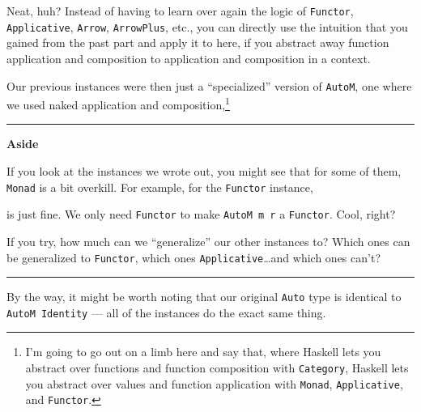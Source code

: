 \documentclass[]{article}
\newenvironment{Shaded}{}{}
\newcommand{\DataTypeTok}[1]{\textcolor[rgb]{0.56,0.13,0.00}{#1}}
\newcommand{\FunctionTok}[1]{\textcolor[rgb]{0.02,0.16,0.49}{#1}}
\newcommand{\KeywordTok}[1]{\textcolor[rgb]{0.00,0.44,0.13}{\textbf{#1}}}
\newcommand{\NormalTok}[1]{#1}
\newcommand{\OtherTok}[1]{\textcolor[rgb]{0.00,0.44,0.13}{#1}}
\begin{document}
Neat, huh? Instead of having to learn over again the logic of \texttt{Functor},
\texttt{Applicative}, \texttt{Arrow}, \texttt{ArrowPlus}, etc., you can directly
use the intuition that you gained from the past part and apply it to here, if
you abstract away function application and composition to application and
composition in a context.

Our previous instances were then just a ``specialized'' version of
\texttt{AutoM}, one where we used naked application and composition,\footnote{I'm
  going to go out on a limb here and say that, where Haskell lets you abstract
  over functions and function composition with \texttt{Category}, Haskell lets
  you abstract over values and function application with \texttt{Monad},
  \texttt{Applicative}, and \texttt{Functor}.}

\begin{center}\rule{0.5\linewidth}{\linethickness}\end{center}

\textbf{Aside}

If you look at the instances we wrote out, you might see that for some of them,
\texttt{Monad} is a bit overkill. For example, for the \texttt{Functor}
instance,

\begin{Shaded}
\end{Shaded}

is just fine. We only need \texttt{Functor} to make \texttt{AutoM\ m\ r} a
\texttt{Functor}. Cool, right?

If you try, how much can we ``generalize'' our other instances to? Which ones
can be generalized to \texttt{Functor}, which ones
\texttt{Applicative}\ldots{}and which ones can't?

\begin{center}\rule{0.5\linewidth}{\linethickness}\end{center}

By the way, it might be worth noting that our original \texttt{Auto} type is
identical to \texttt{AutoM\ Identity} --- all of the instances do the exact same
thing.
\end{document}
